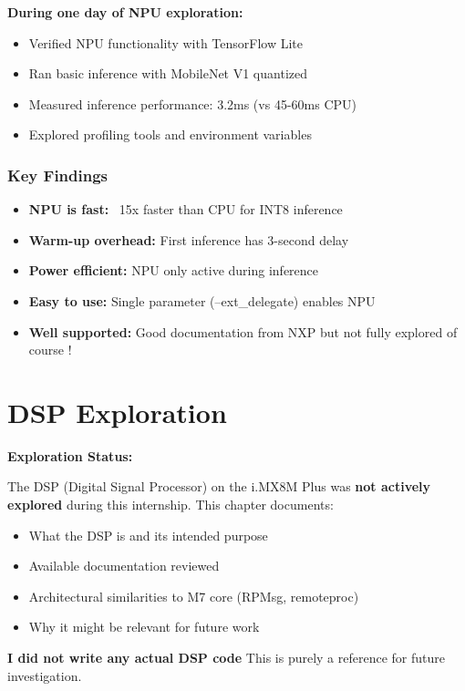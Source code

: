 \documentclass[12pt,a4paper]{report}
\begin{document}
\textbf{During one day of NPU exploration:}
\begin{itemize}
    \item Verified NPU functionality with TensorFlow Lite
    \item Ran basic inference with MobileNet V1 quantized
    \item Measured inference performance: 3.2ms (vs 45-60ms CPU)
    \item Explored profiling tools and environment variables
\end{itemize}

\subsection{Key Findings}

\begin{itemize}
    \item \textbf{NPU is fast:} ~15x faster than CPU for INT8 inference
    \item \textbf{Warm-up overhead:} First inference has 3-second delay
    \item \textbf{Power efficient:} NPU only active during inference
    \item \textbf{Easy to use:} Single parameter (--ext\_delegate) enables NPU
    \item \textbf{Well supported:} Good documentation from NXP but not fully explored of course !
\end{itemize}

\chapter{DSP Exploration}

\begin{important}
\textbf{Exploration Status:}

The DSP (Digital Signal Processor) on the i.MX8M Plus was \textbf{not actively explored} during this internship. This chapter documents:
\begin{itemize}
    \item What the DSP is and its intended purpose
    \item Available documentation reviewed
    \item Architectural similarities to M7 core (RPMsg, remoteproc)
    \item Why it might be relevant for future work
\end{itemize}

\textbf{I did not write any actual DSP code} This is purely a reference for future investigation.
\end{important}
\end{document}
